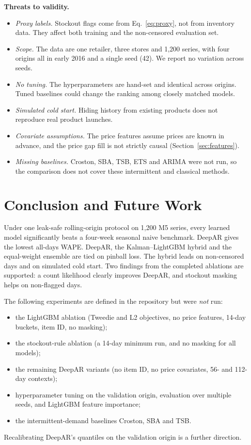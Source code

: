 \documentclass[conference]{IEEEtran}
\begin{document}
\textbf{Threats to validity.}
\begin{itemize}
\item \emph{Proxy labels.} Stockout flags come from Eq.~\eqref{eq:proxy}, not from inventory data. They affect both training and the non-censored evaluation set.
\item \emph{Scope.} The data are one retailer, three stores and 1,200 series, with four origins all in early 2016 and a single seed (42). We report no variation across seeds.
\item \emph{No tuning.} The hyperparameters are hand-set and identical across origins. Tuned baselines could change the ranking among closely matched models.
\item \emph{Simulated cold start.} Hiding history from existing products does not reproduce real product launches.
\item \emph{Covariate assumptions.} The price features assume prices are known in advance, and the price gap fill is not strictly causal (Section~\ref{sec:features}).
\item \emph{Missing baselines.} Croston, SBA, TSB, ETS and ARIMA were not run, so the comparison does not cover these intermittent and classical methods.
\end{itemize}

\section{Conclusion and Future Work}
Under one leak-safe rolling-origin protocol on 1,200 M5 series, every learned model significantly beats a four-week seasonal naive benchmark. DeepAR gives the lowest all-days WAPE. DeepAR, the Kalman--LightGBM hybrid and the equal-weight ensemble are tied on pinball loss. The hybrid leads on non-censored days and on simulated cold start. Two findings from the completed ablations are supported: a count likelihood clearly improves DeepAR, and stockout masking helps on non-flagged days.

The following experiments are defined in the repository but were \emph{not} run:
\begin{itemize}
\item the LightGBM ablation (Tweedie and L2 objectives, no price features, 14-day buckets, item ID, no masking);
\item the stockout-rule ablation (a 14-day minimum run, and no masking for all models);
\item the remaining DeepAR variants (no item ID, no price covariates, 56- and 112-day contexts);
\item hyperparameter tuning on the validation origin, evaluation over multiple seeds, and LightGBM feature importance;
\item the intermittent-demand baselines Croston, SBA and TSB.
\end{itemize}
Recalibrating DeepAR's quantiles on the validation origin is a further direction.
\end{document}
